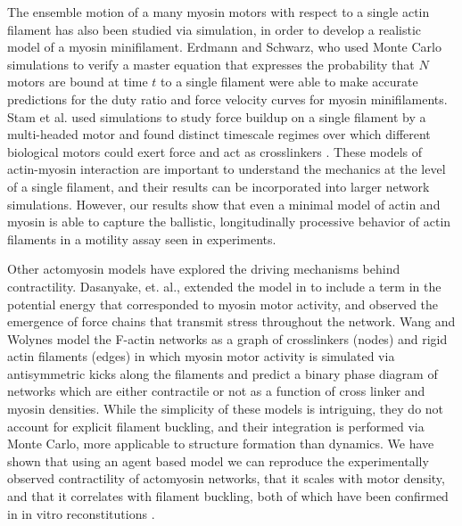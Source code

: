 \documentclass[12pt]{article} \usepackage{times} \usepackage{graphicx}
\begin{document}
\par The ensemble motion of a many myosin motors with respect to a single actin
filament has also been studied via simulation, in order to develop a realistic
model of a myosin minifilament.  Erdmann and Schwarz, who used Monte Carlo
simulations to verify a master equation that expresses the probability that $N$
motors are bound at time $t$ to a single filament\cite{erdmann2012} were able
to make accurate predictions for the duty ratio and force velocity curves for
myosin minifilaments.  Stam et al. used simulations to study force buildup on a
single filament by a multi-headed motor and found distinct timescale regimes
over which different biological motors could exert force and act as
crosslinkers \cite{stam2015}. These models of actin-myosin interaction are
important to understand the mechanics at the level of a single filament, and
their results can be incorporated into larger network simulations.  However,
our results show that even a minimal model of actin and myosin is able to
capture the ballistic, longitudinally processive behavior of actin filaments in
a motility assay seen in experiments. 

\par Other actomyosin models have explored the driving mechanisms behind
contractility.  Dasanyake, et. al., extended the model in \cite{head2003} to
include a term in the potential energy that corresponded to myosin motor
activity, and observed the emergence of force chains that transmit stress
throughout the network\cite{dasanyake2011}.  Wang and Wolynes \cite{wang2012}
model the F-actin networks as a graph of crosslinkers (nodes) and rigid actin
filaments (edges) in which myosin motor activity is simulated via antisymmetric
kicks along the filaments and predict a binary phase diagram of networks which
are either contractile or not as a function of cross linker and myosin
densities. While the simplicity of these models is intriguing, they do not
account for explicit filament buckling, and their integration is performed via
Monte Carlo, more applicable to structure formation than dynamics.  We have
shown that using an agent based model we can reproduce the experimentally
observed contractility of actomyosin networks, that it scales with motor
density, and that it correlates with filament buckling, both of which have been
confirmed in in vitro reconstitutions \cite{murrell2012,murrell2014}.
\end{document}

